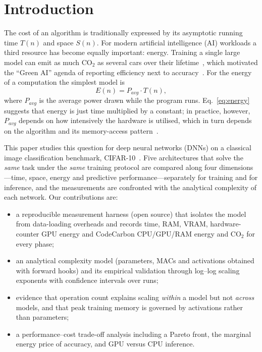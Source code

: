 \documentclass[conference]{IEEEtran}
\begin{document}
\section{Introduction}
The cost of an algorithm is traditionally expressed by its asymptotic running time $T(n)$ and space $S(n)$.
For modern artificial intelligence (AI) workloads a third resource has become equally important: energy.
Training a single large model can emit as much CO$_2$ as several cars over their lifetime~\cite{strubell2019energy},
which motivated the ``Green AI'' agenda of reporting efficiency next to accuracy~\cite{schwartz2020green,henderson2020systematic}.
For the energy of a computation the simplest model is
\begin{equation}
E(n) = P_{avg}\cdot T(n),
\label{eq:energy}
\end{equation}
where $P_{avg}$ is the average power drawn while the program runs. Eq.~\eqref{eq:energy} suggests that energy is just
time multiplied by a constant; in practice, however, $P_{avg}$ depends on how intensively the hardware is utilised,
which in turn depends on the algorithm and its memory-access pattern~\cite{akpinar2026dc,penev2024energy}.

This paper studies this question for deep neural networks (DNNs) on a classical image classification benchmark,
CIFAR-10~\cite{krizhevsky2009cifar}. Five architectures that solve the \emph{same} task under the \emph{same}
training protocol are compared along four dimensions---time, space, energy and predictive performance---separately
for training and for inference, and the measurements are confronted with the analytical complexity of each network.
Our contributions are:
\begin{itemize}
\item a reproducible measurement harness (open source) that isolates the model from data-loading overheads and records
time, RAM, VRAM, hardware-counter GPU energy and CodeCarbon CPU/GPU/RAM energy and CO$_2$ for every phase;
\item an analytical complexity model (parameters, MACs and activations obtained with forward hooks) and its
empirical validation through log--log scaling exponents with confidence intervals over \nruns{} runs;
\item evidence that operation count explains scaling \emph{within} a model but not \emph{across} models,
and that peak training memory is governed by activations rather than parameters;
\item a performance--cost trade-off analysis including a Pareto front, the marginal energy price of accuracy,
and GPU versus CPU inference.
\end{itemize}
\end{document}
